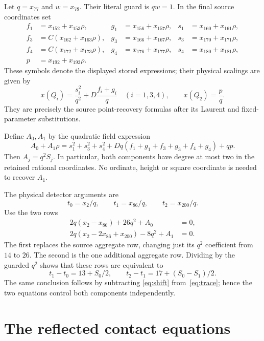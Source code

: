 \documentclass[11pt,a4paper]{article}
\begin{document}
Let $q=x_{77}$ and $w=x_{78}$. Their literal guard is
$qw=1$. In the final source coordinates set
\begin{align*}
 f_1&=x_{152}+x_{153}\rho,&g_1&=x_{156}+x_{157}\rho,
 &s_1&=x_{160}+x_{161}\rho,\\
 f_3&=C(x_{162}+x_{163}\rho),&g_3&=x_{166}+x_{167}\rho,
 &s_3&=x_{170}+x_{171}\rho,\\
 f_4&=C(x_{172}+x_{173}\rho),&g_4&=x_{176}+x_{177}\rho,
 &s_4&=x_{180}+x_{181}\rho,\\
 p&=x_{192}+x_{193}\rho.&&&&
\end{align*}
These symbols denote the displayed stored expressions; their
physical scalings are given by
\begin{equation}\label{eq:recovery}
 x(Q_i)=\frac{s_i^2}{q^2}+D\frac{f_i+g_i}{q}
 \quad(i=1,3,4),\qquad x(Q_2)=\frac p q.
\end{equation}
They are precisely the source point-recovery formulas after its
Laurent and fixed-parameter substitutions.

Define $A_0,A_1$ by the quadratic field expression
\begin{equation}\label{eq:components}
 A_0+A_1\rho
 =s_1^2+s_3^2+s_4^2
  +Dq(f_1+g_1+f_3+g_3+f_4+g_4)+qp.
\end{equation}
Then $A_j=q^2S_j$. In particular, both components have degree
at most two in the retained rational coordinates. No ordinate,
height or square coordinate is needed to recover $A_1$.

The physical detector arguments are
\[
 t_0=x_2/q,\qquad t_1=x_{86}/q,\qquad t_2=x_{200}/q.
\]
Use the two rows
\begin{align}
 2q(x_2-x_{86})+26q^2+A_0&=0,
   \label{eq:trace}\\
 2q(x_2-2x_{86}+x_{200})-8q^2+A_1&=0.
   \label{eq:shift}
\end{align}
The first replaces the source aggregate row, changing just its
$q^2$ coefficient from $14$ to $26$.
The second is the one additional aggregate row.
Dividing by the guarded $q^2$ shows that these rows are equivalent
to
\begin{equation}\label{eq:physical-shifts}
 t_1-t_0=13+S_0/2,\qquad
 t_2-t_1=17+(S_0-S_1)/2.
\end{equation}
The same conclusion follows by subtracting
\eqref{eq:shift} from~\eqref{eq:trace}; hence the two equations
control both components independently.

\section{The reflected contact equations}
\end{document}
